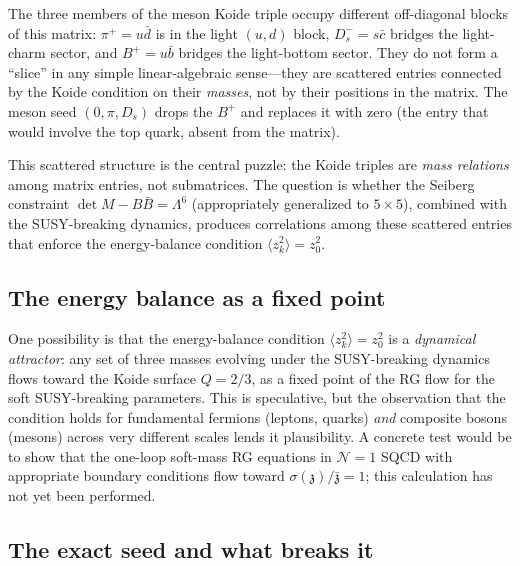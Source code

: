 \documentclass[12pt,a4paper]{article}
\newcommand{\zch}{\mathfrak{z}}
\begin{document}
The three members of the meson Koide triple occupy different 
off-diagonal blocks of this matrix: $\pi^+ = u\bar{d}$ is in the 
light $(u,d)$ block, $D_s^- = s\bar{c}$ bridges the light-charm 
sector, and $B^+ = u\bar{b}$ bridges the light-bottom sector. They 
do not form a ``slice'' in any simple linear-algebraic sense---they 
are scattered entries connected by the Koide condition on their 
\emph{masses}, not by their positions in the matrix. The meson seed 
$(0, \pi, D_s)$ drops the $B^+$ and replaces it with zero (the 
entry that would involve the top quark, absent from the matrix).

This scattered structure is the central puzzle: the Koide triples 
are \emph{mass relations} among matrix entries, not submatrices. 
The question is whether the Seiberg constraint 
$\det M - B\bar{B} = \Lambda^6$ (appropriately generalized to 
$5 \times 5$), combined with the SUSY-breaking dynamics, produces 
correlations among these scattered entries that enforce the 
energy-balance condition $\langle z_k^2\rangle = z_0^2$.

\subsection{The energy balance as a fixed point}
\label{subsec:fixedpoint}
One possibility is that the energy-balance condition 
$\langle z_k^2\rangle = z_0^2$ is a \emph{dynamical attractor}: 
any set of three masses evolving under the SUSY-breaking dynamics 
flows toward the Koide surface $Q = 2/3$, as a fixed point of the 
RG flow for the soft SUSY-breaking parameters. This is speculative, 
but the observation that the condition holds for fundamental fermions 
(leptons, quarks) \emph{and} composite bosons (mesons) across very 
different scales lends it plausibility. A concrete test would be to 
show that the one-loop soft-mass RG equations in $\mathcal{N}=1$ 
SQCD with appropriate boundary conditions flow toward 
$\sigma(\zch)/\bar{\zch} = 1$; this calculation has not yet been 
performed.

\subsection{The exact seed and what breaks it}
\label{subsec:exactseed}
\end{document}
